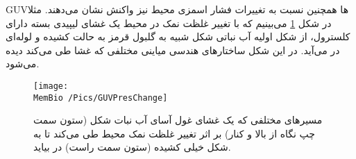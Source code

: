 GUVها همچنین نسبت به تغییرات فشار اسمزی محیط نیز واکنش نشان می‌دهند. مثلا در شکل 
\ref{fig:GUVPresChange}
می‌بینیم که با تغییر غلظت نمک در محیط یک غشای لیپیدی بسته دارای کلسترول، از شکل اولیه آب نباتی شکل 
شبیه‌ به گلبول قرمز به حالت کشیده و لوله‌ای در می‌آید. در این شکل ساختار‌های هندسی میاینی مختلفی که غشا طی می‌کند دیده می‌شود.
 \begin{figure}[h]
\begin{center}
\texttt{[image: \\MemBio /Pics/GUVPresChange]}
\caption{
مسیر‌های مختلفی که یک غشای غول آسای آب نبات شکل (ستون سمت چپ نگاه از بالا و کنار) بر اثر تغییر غلظت نمک محیط طی می‌کند تا به شکل خیلی کشیده (ستون سمت راست) در بیاید.
}
\label{fig:GUVPresChange}
\end{center}
\end{figure}
 
 
 
 
 
 
 
 
 
 
 